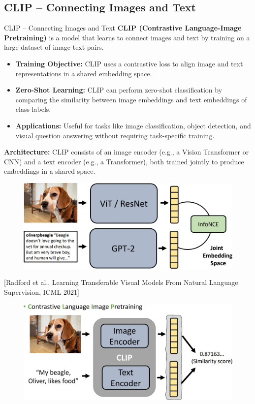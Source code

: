 \subsection{CLIP – Connecting Images and Text}
\begin{frame}[allowframebreaks]{CLIP – Connecting Images and Text}
    \textbf{CLIP (Contrastive Language-Image Pretraining)} is a model that learns to connect images and text by training on a large dataset of image-text pairs.

    \begin{itemize}
        \item \textbf{Training Objective:} CLIP uses a contrastive loss to align image and text representations in a shared embedding space.
        \item \textbf{Zero-Shot Learning:} CLIP can perform zero-shot classification by comparing the similarity between image embeddings and text embeddings of class labels.
        \item \textbf{Applications:} Useful for tasks like image classification, object detection, and visual question answering without requiring task-specific training.
    \end{itemize}
\framebreak
    \textbf{Architecture:} CLIP consists of an image encoder (e.g., a Vision Transformer or CNN) and a text encoder (e.g., a Transformer), both trained jointly to produce embeddings in a shared space.
    \begin{figure}
        \centering
        \includegraphics[width=1\textwidth,height=0.6\textheight,keepaspectratio]{images/video/slide_51_1_img.jpg}
    \end{figure}
    \footnotesize{[Radford et al., Learning Transferable Visual Models From Natural Language Supervision, ICML 2021]}
\framebreak
    \begin{figure}
        \centering
        \includegraphics[width=1\textwidth,height=0.9\textheight,keepaspectratio]{images/video/slide_52_1_img.jpg}

\end{figure}
\end{frame}
